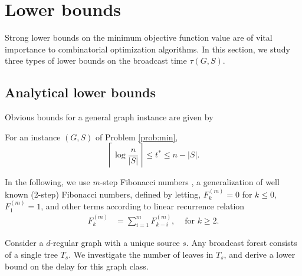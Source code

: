 \section{Lower bounds}
Strong lower bounds on the minimum objective function value are of vital importance to combinatorial optimization algorithms.
In this section, we study three types of lower bounds on the broadcast time $\tau(G,S)$.

\subsection{Analytical lower bounds} \label{sec:lbanalyt}
Obvious bounds for a general graph instance are given by
\begin{observation}
For an instance $(G,S)$ of Problem \ref{prob:min},
\begin{equation}
\left\lceil\log\frac{n}{|S|}\right\rceil\leq t^* \leq n-|S|.
\label{eq:loglb}
\end{equation}
\label{obs:loglb}
\end{observation}

In the following, we use $m$-step Fibonacci numbers \cite{noe05}, a generalization of well known (2-step) Fibonacci numbers, defined by letting, 
$F^{(m)}_k=0$ for $k\leq 0$, $F^{(m)}_1=1$, and 
other terms according to linear recurrence relation 
\begin{align*}
F^{(m)}_k &=\sum\limits_{i=1}^m F^{(m)}_{k-i}, &\text{ for } k\geq 2.
\end{align*}

Consider a $d$-regular graph with a unique source $s$.
Any broadcast forest consists of a single tree $T_s$.
We investigate the number of leaves in $T_s$, and derive a lower bound on the delay for this graph class.

